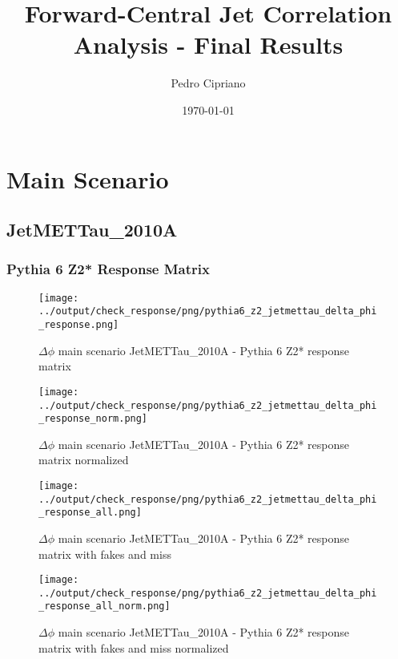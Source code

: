 \documentclass[11pt]{book}
\begin{document}
         
 
 \author{Pedro Cipriano}
 \date{\today}
 \title{Forward-Central Jet Correlation Analysis - Final Results}

\maketitle

\tableofcontents

\newpage
\chapter{Main Scenario}
\section{JetMETTau\_2010A}
\subsection{Pythia 6 Z2* Response Matrix}

\begin{figure}[ht]
\centering
\texttt{[image: ../output/check\_response/png/pythia6\_z2\_jetmettau\_delta\_phi\_response.png]}
\caption{$\Delta\phi$ main scenario JetMETTau\_2010A - Pythia 6 Z2* response matrix}
\label{p6_jetmettau_delta_phi_response}
\end{figure}

\begin{figure}[ht]
\centering
\texttt{[image: ../output/check\_response/png/pythia6\_z2\_jetmettau\_delta\_phi\_response\_norm.png]}
\caption{$\Delta\phi$ main scenario JetMETTau\_2010A - Pythia 6 Z2* response matrix normalized}
\label{p6_jetmettau_delta_phi_response_norm}
\end{figure}

\begin{figure}[ht]
\centering
\texttt{[image: ../output/check\_response/png/pythia6\_z2\_jetmettau\_delta\_phi\_response\_all.png]}
\caption{$\Delta\phi$ main scenario JetMETTau\_2010A - Pythia 6 Z2* response matrix with fakes and miss}
\label{p6_jetmettau_delta_phi_response_all}
\end{figure}

\begin{figure}[ht]
\centering
\texttt{[image: ../output/check\_response/png/pythia6\_z2\_jetmettau\_delta\_phi\_response\_all\_norm.png]}
\caption{$\Delta\phi$ main scenario JetMETTau\_2010A - Pythia 6 Z2* response matrix with fakes and miss normalized}
\label{p6_jetmettau_delta_phi_response_all_norm}
\end{figure}
\end{document}
